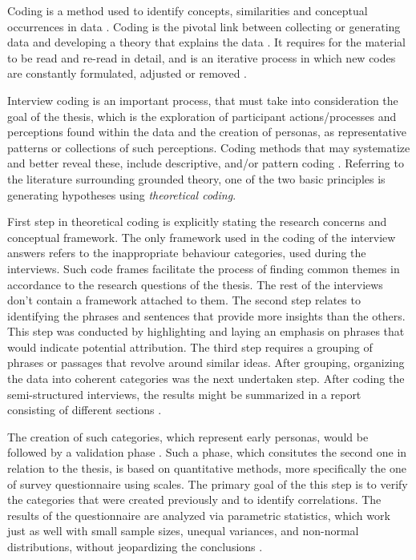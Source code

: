 Coding is a method used to identify concepts, similarities and conceptual occurrences in data . Coding is the pivotal link between collecting or generating data and developing a theory that explains the data \cite{Charmaz2012}. It requires for the material to be read and re-read in detail, and is an iterative process in which new codes are constantly formulated, adjusted or removed \cite{Runeson2012}. 

Interview coding is an important process, that must take into consideration the goal of the thesis, which is the exploration of participant actions/processes and perceptions found within the data and the creation of personas, as representative patterns or collections of such perceptions. Coding methods that may systematize and better reveal these, include descriptive, and/or pattern coding \cite{Wicks2017}. Referring to the literature surrounding grounded theory, one of the two basic principles is generating hypotheses using \textit{theoretical coding}. 

First step in theoretical coding is explicitly stating the research concerns and conceptual framework. The only framework used in the coding of the interview answers refers to the inappropriate behaviour categories, used during the interviews. Such code frames facilitate the process of finding common themes in accordance to the research questions of the thesis. The rest of the interviews don't contain a framework attached to them. The second step relates to identifying the phrases and sentences that provide more insights than the others. This step was conducted by highlighting and laying an emphasis on phrases that would indicate potential attribution. The third step requires a grouping of phrases or passages that revolve around similar ideas. After grouping, organizing the data into coherent categories was the next undertaken step. After coding the semi-structured interviews, the results might be summarized in a report consisting of different sections \cite{Yin2009}.

The creation of such categories, which represent early personas, would be followed by a validation phase \cite{Miaskiewicz2008}. Such a phase, which consitutes the second one in relation to the thesis, is based on quantitative methods, more specifically the one of survey questionnaire using scales. The primary goal of the this step is to verify the categories that were created previously and to identify correlations. The results of the questionnaire are analyzed via parametric statistics, which work just as well with small sample sizes, unequal variances, and non-normal distributions, without jeopardizing the conclusions \cite{Norman2010}.

